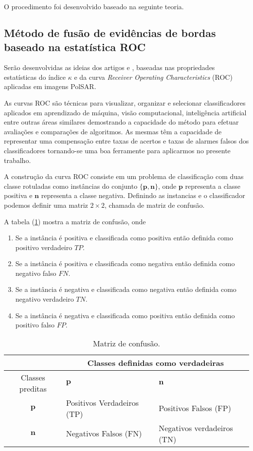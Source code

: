 O procedimento foi desenvolvido baseado na seguinte teoria.
\subsection{Método de fusão de evidências de bordas baseado na estatística ROC}
Serão desenvolvidas as ideias dos artigos \citet{gs} e \citet{fawcett}, baseadas nas propriedades estatísticas do índice $\kappa$ e da curva \textit{Receiver Operating Characteristics} (ROC) aplicadas em imagens PolSAR.

As curvas ROC são técnicas para visualizar, organizar e selecionar classificadores aplicados em aprendizado de máquina, visão computacional, inteligência artificial entre outras áreas similares demostrando a capacidade do método para efetuar avaliações e comparações de algoritmos. As mesmas têm a capacidade de representar uma compensação entre taxas de acertos e taxas de alarmes falsos dos classificadores tornando-se uma boa ferramente para aplicarmos no presente trabalho. 

A construção da curva ROC consiste em um problema de classificação com duas classe rotuladas como instâncias do conjunto $\{\mathbf{p},\mathbf{n}\}$, onde $\mathbf{p}$ representa a classe positiva e $\mathbf{n}$ representa a classe negativa. Definindo as instancias e o classificador podemos definir uma matriz $2\times 2$, chamada de matriz de confusão. 

A tabela (\ref{tab01:cap_fusao}) mostra a matriz de confusão, onde
\begin{enumerate}
    \item Se a instância é positiva e classificada como positiva então definida como positivo verdadeiro $TP$.
    \item Se a instância é positiva e classificada como negativa então definida como negativo falso $FN$.
	\item Se a instância é negativa e classificada como negativa então definida como negativo verdadeiro $TN$.
	\item Se a instância é negativa e classificada como positiva então definida como positivo falso $FP$.
\end{enumerate}

\begin{table}[hbt]
	\centering
	\caption{Matriz de confusão.}\label{tab01:cap_fusao}
\begin{tabular}{@{}cll@{}} \toprule
	                        & \multicolumn{2}{c}{Classes definidas como verdadeiras}           \\ \midrule
	 Classes preditas       & $\mathbf{p}$                & $\mathbf{n}$                \\
                 $\mathbf{p}$& Positivos Verdadeiros (TP) & Positivos Falsos (FP)      \\ 
	             $\mathbf{n}$& Negativos Falsos      (FN) & Negativos verdadeiros (TN) \\ \bottomrule 
\end{tabular}
\end{table}

